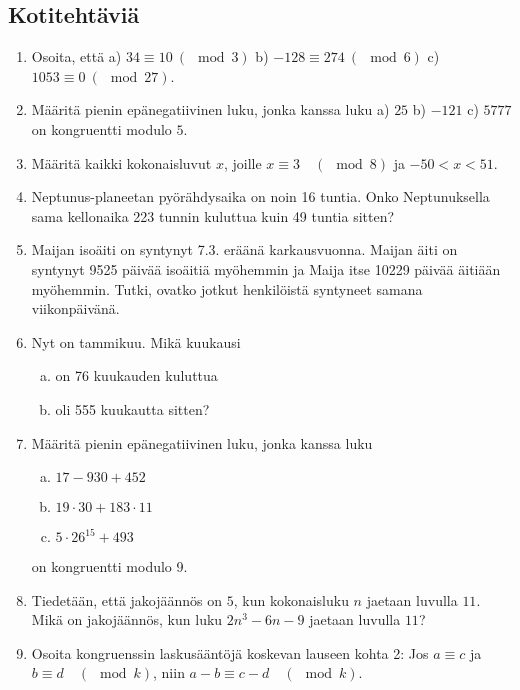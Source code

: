 \subsection*{Kotitehtäviä}

\begin{enumerate}

\item
Osoita, että a) $34 \equiv 10\ (\mod 3)$ b) $-128 \equiv 274\ (\mod 6)$ c) $1053 \equiv 0\ (\mod 27)$.

\item
Määritä pienin epänegatiivinen luku, jonka kanssa luku a) $25$ b) $-121$ c) $5777$ on kongruentti modulo $5$.

\item
Määritä kaikki kokonaisluvut $x$, joille $x \equiv 3\quad (\mod 8)$ ja $-50 < x < 51$.

\item Neptunus-planeetan pyörähdysaika on noin 16 tuntia. Onko Neptunuksella sama kellonaika 223 tunnin kuluttua kuin 49 tuntia sitten?

\item Maijan isoäiti on syntynyt 7.3. eräänä karkausvuonna. Maijan äiti on syntynyt 9525 päivää isoäitiä myöhemmin ja Maija itse 10229 päivää äitiään myöhemmin. Tutki, ovatko jotkut henkilöistä syntyneet samana viikonpäivänä.

\item Nyt on tammikuu. Mikä kuukausi
\begin{enumerate}[a)]
\item on 76 kuukauden kuluttua
\item oli 555 kuukautta sitten?
\end{enumerate}

\item Määritä pienin epänegatiivinen luku, jonka kanssa luku
\begin{enumerate}[a)]
\item $17 - 930 + 452$
\item $19 \cdot 30 + 183 \cdot 11$
\item $5 \cdot 26^{15} + 493$
\end{enumerate}
on kongruentti modulo 9.

\item
Tiedetään, että jakojäännös on $5$, kun kokonaisluku $n$ jaetaan luvulla $11$. Mikä on jakojäännös, kun luku $2n^3 - 6n - 9$ jaetaan luvulla $11$?

\item
Osoita kongruenssin laskusääntöjä koskevan lauseen kohta 2: Jos $a\equiv c$ ja $b\equiv d\quad (\mod k)$, niin $a-b\equiv c-d \quad(\mod k)$.


\end{enumerate}
